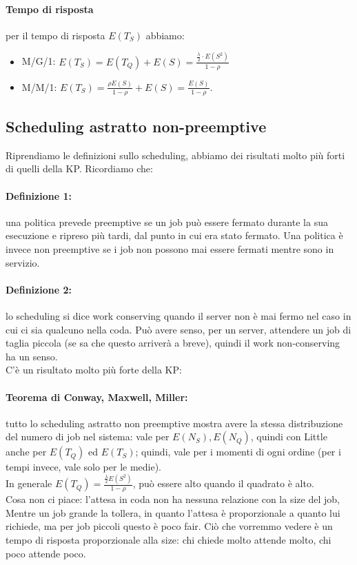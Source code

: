 \documentclass{article}
\begin{document}
\paragraph{Tempo di risposta} per il tempo di risposta $E(T_S)$ abbiamo:
\begin{itemize}
\item M/G/1: $E(T_S) = E(T_Q) + E(S) = \frac{\frac{\lambda}{2} \cdot E(S^2)}{1 - \rho}$
\item M/M/1: $E(T_S) = \frac{\rho E(S)}{1 - \rho} + E(S) = \frac{E(S)}{1 - \rho}$.
\end{itemize}
\subsection{Scheduling astratto non-preemptive}
Riprendiamo le definizioni sullo scheduling, abbiamo dei risultati molto più forti di quelli della KP. Ricordiamo che: 
\paragraph{Definizione 1:}una politica prevede preemptive se un job può essere fermato durante la sua esecuzione e ripreso più tardi, dal punto in cui era stato fermato. Una politica è invece non preemptive se i job non possono mai essere fermati mentre sono in servizio.
\paragraph{Definizione 2:}lo scheduling si dice work conserving quando il server non è mai fermo nel caso in cui ci sia qualcuno nella coda. Può avere senso, per un server, attendere un job di taglia piccola (se sa che questo arriverà a breve), quindi il work non-conserving ha un senso.\\ C'è un risultato molto più forte della KP:
\paragraph{Teorema di Conway, Maxwell, Miller:} tutto lo scheduling astratto non preemptive mostra avere la stessa distribuzione del numero di job nel sistema: vale per $E(N_S), E(N_Q)$, quindi con Little anche per $E(T_Q)$ ed $E(T_S)$; quindi, vale per i momenti di ogni ordine (per i tempi invece, vale solo per le medie).\\ In generale $E(T_Q) = \frac{\frac{\lambda}{2} E(S^2)}{1 - \rho}$, può essere alto quando il quadrato è alto.\\ Cosa non ci piace: l'attesa in coda non ha nessuna relazione con la size del job, Mentre un job grande la tollera, in quanto l'attesa è proporzionale a quanto lui richiede, ma per job piccoli questo è poco fair. Ciò che vorremmo vedere è un tempo di risposta proporzionale alla size: chi chiede molto attende molto, chi poco attende poco.
\end{document}
